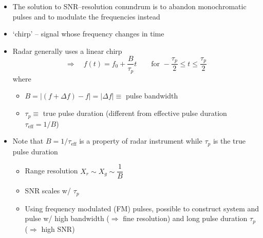 \documentclass[11pt, oneside]{article}
\newcommand{\teff}{\tau_\mathrm{eff}}
\begin{document}
\begin{itemize}
	\item[--] The solution to SNR--resolution conundrum is to abandon monochromatic pulses and to modulate the frequencies instead
	\item[--] `chirp' -- signal whose frequency changes in time
	\item[--] Radar generally uses a linear chirp
	\begin{equation}
		\label{e:ft}
		\Rightarrow\quad f(t) = f_0 + \frac{B}{\tau_p}t \qquad \text{for } -\frac{\tau_p}{2} \le t \le \frac{\tau_p}{2}
	\end{equation}
	where
	\begin{itemize}
		\item[] $B = |(f + \Delta f) - f| = |\Delta f| \equiv$ pulse bandwidth
		\item[] $\tau_p \equiv$ true pulse duration (different from effective pulse duration $\teff = 1/B$)
	\end{itemize}
	\item[--] Note that $B = 1/\teff$ is a property of radar instrument while $\tau_p$ is the true pulse duration
	\begin{itemize}
		\item[$\bigstar$] Range resolution $X_r \sim X_g \sim \dfrac{1}{B}$
		\item[$\bigstar$] SNR scales w/ $\tau_p$
		\item[$\bigstar$] Using frequency modulated (FM) pulses, possible to construct system and pulse w/ high bandwidth ($\Rightarrow$ fine resolution) and long pulse duration $\tau_p$ ($\Rightarrow$ high SNR)
	\end{itemize}

\end{itemize}
\end{document}
